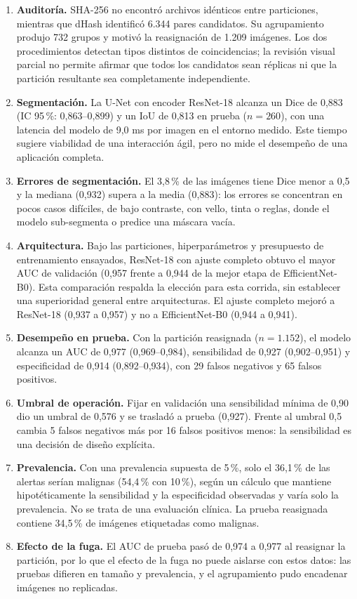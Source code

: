 \documentclass[conference]{IEEEtran}
\begin{document}
	\begin{enumerate}
		\item \textbf{Auditoría.} SHA-256 no encontró archivos idénticos entre particiones, mientras que dHash identificó 6.344 pares candidatos. Su agrupamiento produjo 732 grupos y motivó la reasignación de 1.209 imágenes. Los dos procedimientos detectan tipos distintos de coincidencias; la revisión visual parcial no permite afirmar que todos los candidatos sean réplicas ni que la partición resultante sea completamente independiente.
		\item \textbf{Segmentación.} La U-Net con encoder ResNet-18 alcanza un Dice de 0,883 (IC 95\,\%: 0,863--0,899) y un IoU de 0,813 en prueba ($n = 260$), con una latencia del modelo de 9,0 ms por imagen en el entorno medido. Este tiempo sugiere viabilidad de una interacción ágil, pero no mide el desempeño de una aplicación completa.
		\item \textbf{Errores de segmentación.} El 3,8\,\% de las imágenes tiene Dice menor a 0,5 y la mediana (0,932) supera a la media (0,883): los errores se concentran en pocos casos difíciles, de bajo contraste, con vello, tinta o reglas, donde el modelo sub-segmenta o predice una máscara vacía.
		\item \textbf{Arquitectura.} Bajo las particiones, hiperparámetros y presupuesto de entrenamiento ensayados, ResNet-18 con ajuste completo obtuvo el mayor AUC de validación (0,957 frente a 0,944 de la mejor etapa de EfficientNet-B0). Esta comparación respalda la elección para esta corrida, sin establecer una superioridad general entre arquitecturas. El ajuste completo mejoró a ResNet-18 (0,937 a 0,957) y no a EfficientNet-B0 (0,944 a 0,941).
		\item \textbf{Desempeño en prueba.} Con la partición reasignada ($n = 1.152$), el modelo alcanza un AUC de 0,977 (0,969--0,984), sensibilidad de 0,927 (0,902--0,951) y especificidad de 0,914 (0,892--0,934), con 29 falsos negativos y 65 falsos positivos.
		\item \textbf{Umbral de operación.} Fijar en validación una sensibilidad mínima de 0,90 dio un umbral de 0,576 y se trasladó a prueba (0,927). Frente al umbral 0,5 cambia 5 falsos negativos más por 16 falsos positivos menos: la sensibilidad es una decisión de diseño explícita.
		\item \textbf{Prevalencia.} Con una prevalencia supuesta de 5\,\%, solo el 36,1\,\% de las alertas serían malignas (54,4\,\% con 10\,\%), según un cálculo que mantiene hipotéticamente la sensibilidad y la especificidad observadas y varía solo la prevalencia. No se trata de una evaluación clínica. La prueba reasignada contiene 34,5\,\% de imágenes etiquetadas como malignas.
		\item \textbf{Efecto de la fuga.} El AUC de prueba pasó de 0,974 a 0,977 al reasignar la partición, por lo que el efecto de la fuga no puede aislarse con estos datos: las pruebas difieren en tamaño y prevalencia, y el agrupamiento pudo encadenar imágenes no replicadas.
	\end{enumerate}
	
\end{document}
